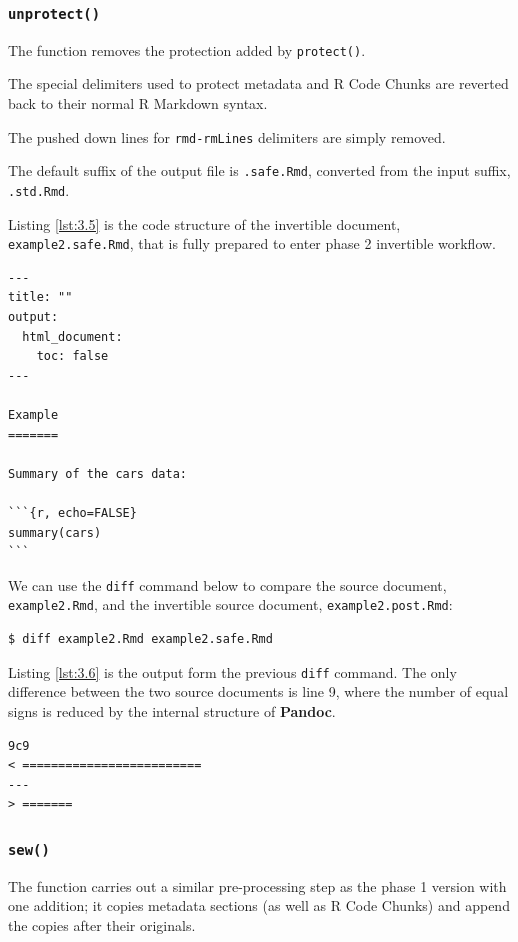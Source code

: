 \documentclass[a4paper, 12pt]{report}
\begin{document}
\subsubsection*{\texttt{unprotect()}}
The function removes the protection added by \texttt{protect()}.

The special delimiters used to protect metadata and R Code Chunks are reverted back to their normal R Markdown syntax.

The pushed down lines for \texttt{rmd-rmLines} delimiters are simply removed.

The default suffix of the output file is \texttt{.safe.Rmd}, converted from the input suffix, \texttt{.std.Rmd}.

Listing \ref{lst:3.5} is the code structure of the invertible document, \texttt{example2.safe.Rmd}, that is fully prepared to enter phase 2 invertible workflow.
\begin{lstlisting}[caption={\texttt{example2.safe.Rmd}}, escapechar=\|, label={lst:3.5}]
---
title: ""
output:
  html_document:
    toc: false
---

Example
=======

Summary of the cars data:

```{r, echo=FALSE}
summary(cars)
```
\end{lstlisting}

We can use the \texttt{diff} command below to compare the source document, \texttt{example2.Rmd}, and the invertible source document, \texttt{example2.post.Rmd}:
\begin{lstlisting}[numbers=none, frame=none]
$ diff example2.Rmd example2.safe.Rmd
\end{lstlisting}

Listing \ref{lst:3.6} is the output form the previous \texttt{diff} command. The only difference between the two source documents is line 9, where the number of equal signs is reduced by the internal structure of \textbf{Pandoc}.
\begin{lstlisting}[caption={Output from \texttt{diff}}, label={lst:3.6}]
9c9
< =========================
---
> =======
\end{lstlisting}


\subsubsection*{\texttt{sew()}}
The function carries out a similar pre-processing step as the phase 1 version with one addition; it copies metadata sections (as well as R Code Chunks) and append the copies after their originals.
\end{document}
